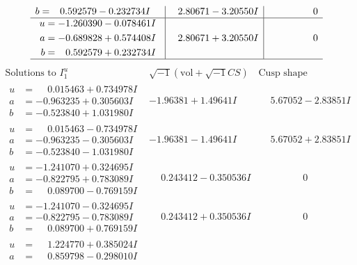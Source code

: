 \documentclass[1p]{elsarticle_modified}
\theoremstyle{definition}
\newcommand{\I}{\sqrt{-1}}
\begin{document}
$$\begin{array}{c|c|c}
\begin{aligned}
b &= \phantom{-}0.592579 - 0.232734 I\end{aligned}
 & \phantom{-}2.80671 - 3.20550 I & \phantom{-0.000000 } 0 \\ \hline\begin{aligned}
u &= -1.260390 - 0.078461 I \\
a &= -0.689828 + 0.574408 I \\
b &= \phantom{-}0.592579 + 0.232734 I\end{aligned}
 & \phantom{-}2.80671 + 3.20550 I & \phantom{-0.000000 } 0\\
 \hline 
 \end{array}$$\newpage$$\begin{array}{c|c|c}  
\text{Solutions to }I^u_{1}& \I (\text{vol} + \sqrt{-1}CS) & \text{Cusp shape}\\
 \hline 
\begin{aligned}
u &= \phantom{-}0.015463 + 0.734978 I \\
a &= -0.963235 + 0.305603 I \\
b &= -0.523840 + 1.031980 I\end{aligned}
 & -1.96381 + 1.49641 I & \phantom{-}5.67052 - 2.83851 I \\ \hline\begin{aligned}
u &= \phantom{-}0.015463 - 0.734978 I \\
a &= -0.963235 - 0.305603 I \\
b &= -0.523840 - 1.031980 I\end{aligned}
 & -1.96381 - 1.49641 I & \phantom{-}5.67052 + 2.83851 I \\ \hline\begin{aligned}
u &= -1.241070 + 0.324695 I \\
a &= -0.822795 + 0.783089 I \\
b &= \phantom{-}0.089700 - 0.769159 I\end{aligned}
 & \phantom{-}0.243412 - 0.350536 I & \phantom{-0.000000 } 0 \\ \hline\begin{aligned}
u &= -1.241070 - 0.324695 I \\
a &= -0.822795 - 0.783089 I \\
b &= \phantom{-}0.089700 + 0.769159 I\end{aligned}
 & \phantom{-}0.243412 + 0.350536 I & \phantom{-0.000000 } 0 \\ \hline\begin{aligned}
u &= \phantom{-}1.224770 + 0.385024 I \\
a &= \phantom{-}0.859798 - 0.298010 I \\

\end{aligned}
\end{array}$$
\end{document}
